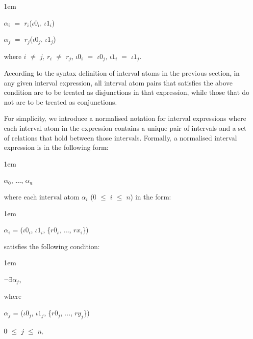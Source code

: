 \documentclass[11pt]{report}
\newenvironment{vquote}
{
  \begin{list}{}{\leftmargin 1em}\item[]
}
{
  \end{list}
}
\begin{document}
\begin{itemize}
              \begin{vquote}
                ${\alpha}_i$ $=$ $r_i$(${\iota}0_i$, ${\iota}1_i$) 

                ${\alpha}_j$ $=$ $r_j$(${\iota}0_j$, ${\iota}1_j$)

                where
                $i$ $\neq$ $j$,
                $r_i$ $\neq$ $r_j$,
                ${\iota}0_i$ $=$ ${\iota}0_j$,
                ${\iota}1_i$ $=$ ${\iota}1_j$.
              \end{vquote}

              According to the syntax definition of interval atoms in the
              previous section, in any given interval expression, all interval
              atom pairs that satisfies the above condition are to be treated
              as disjunctions in that expression, while those that do not are
              to be treated as conjunctions.

              For simplicity, we introduce a normalised notation for interval
              expressions where each interval atom in the expression contains a 
              unique pair of intervals and a set of relations that hold between
              those intervals. Formally, a normalised interval expression is
              in the following form:

              \begin{vquote}
                ${\alpha}_0$, $\ldots$, ${\alpha}_n$
              \end{vquote}

              \noindent
              where each interval atom ${\alpha}_i$ ($0$ $\leq$ $i$ $\leq$ $n$)
              in the form:

              \begin{vquote}
                ${\alpha}_i$ =
                  (${\iota}0_i$, ${\iota}1_i$, \{$r0_i$, $\ldots$, $rx_i$\})
              \end{vquote}

              \noindent
              satisfies the following condition:

              \begin{vquote}

                $\lnot$$\exists$${\alpha}_j$,

                where 

                ${\alpha}_j$ =
                  (${\iota}0_j$, ${\iota}1_j$, \{$r0_j$, $\ldots$, $ry_j$\})

                $0$ $\leq$ $j$ $\leq$ $n$,


\end{vquote}
\end{itemize}
\end{document}
